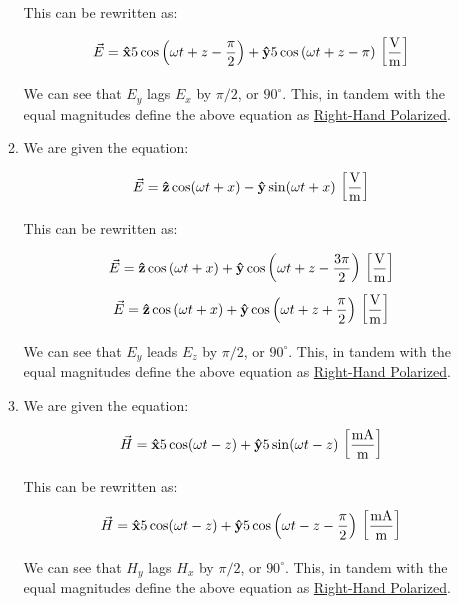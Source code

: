 \begin{enumerate}
\begin{enumerate}
        This can be rewritten as:

        $$\vec{E}=\bold{\hat{x}}5\cos\left(\omega t + z - \frac{\pi}{2}\right)+\bold{\hat{y}}5\cos\left(\omega t + z-\pi\right)\,\left[ \frac{\si{\volt}}{\si{\meter}} \right]$$

        We can see that $E_y$ lags $E_x$ by $\pi/2$, or $90^{\circ}$. This, in tandem with the equal magnitudes define the above equation as \underline{Right-Hand Polarized}.

      \item 

        We are given the equation:

        $$\vec{E}=\bold{\hat{z}}\cos(\omega t + x)-\bold{\hat{y}}\sin(\omega t + x)\,\left[ \frac{\si{\volt}}{\si{\meter}} \right]$$

        This can be rewritten as:

        $$\vec{E}=\bold{\hat{z}}\cos\left(\omega t + x\right)+\bold{\hat{y}}\cos\left(\omega t + z-\frac{3\pi}{2}\right)\,\left[ \frac{\si{\volt}}{\si{\meter}} \right]$$
        $$\vec{E}=\bold{\hat{z}}\cos\left(\omega t + x\right)+\bold{\hat{y}}\cos\left(\omega t + z+\frac{\pi}{2}\right)\,\left[ \frac{\si{\volt}}{\si{\meter}} \right]$$

        We can see that $E_y$ leads $E_z$ by $\pi/2$, or $90^{\circ}$. This, in tandem with the equal magnitudes define the above equation as \underline{Right-Hand Polarized}.

      \item 

        We are given the equation:

        $$\vec{H}=\bold{\hat{x}}5\cos(\omega t - z)+\bold{\hat{y}}5\sin(\omega t -z)\,\left[ \frac{\si{\milli\ampere}}{\si{\meter}} \right]$$

        This can be rewritten as:

        $$\vec{H}=\bold{\hat{x}}5\cos(\omega t - z)+\bold{\hat{y}}5\cos\left(\omega t -z-\frac{\pi}{2}\right)\,\left[ \frac{\si{\milli\ampere}}{\si{\meter}} \right]$$

        We can see that $H_y$ lags $H_x$ by $\pi/2$, or $90^{\circ}$. This, in tandem with the equal magnitudes define the above equation as \underline{Right-Hand Polarized}.

    \end{enumerate}

\end{enumerate}



